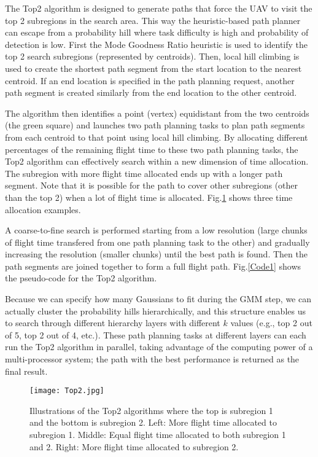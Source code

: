 The Top2 algorithm is designed to generate paths that force the UAV to visit the top 2 subregions in the search area. This way the heuristic-based path planner can escape from a probability hill where task difficulty is high and probability of detection is low. First the Mode Goodness Ratio heuristic is used to identify the top 2 search subregions (represented by centroids). Then, local hill climbing is used to create the shortest path segment from the start location to the nearest centroid. If an end location is specified in the path planning request, another path segment is created similarly from the end location to the other centroid. 

The algorithm then identifies a point (vertex) equidistant from the two centroids (the green square) and launches two path planning tasks to plan path segments from each centroid to that point using local hill climbing. By allocating different percentages of the remaining flight time to these two path planning tasks, the Top2 algorithm can effectively search within a new dimension of time allocation. The subregion with more flight time allocated ends up with a longer path segment. Note that it is possible for the path to cover other subregions (other than the top 2) when a lot of flight time is allocated. Fig.\ref{Top2} shows three time allocation examples. 

A coarse-to-fine search is performed starting from a low resolution (large chunks of flight time transfered from one path planning task to the other) and gradually increasing the resolution (smaller chunks) until the best path is found. Then the path segments are joined together to form a full flight path. Fig.\ref{Code1} shows the pseudo-code for the Top2 algorithm.

Because we can specify how many Gaussians to fit during the GMM step, we can actually cluster the probability hills hierarchically, and this structure enables us to search through different hierarchy layers with different $k$ values (e.g., top 2 out of 5, top 2 out of 4, etc.). These path planning tasks at different layers can each run the Top2 algorithm in parallel, taking advantage of the computing power of a multi-processor system; the path with the best performance is returned as the final result.
\begin{figure}
\centering
\texttt{[image: Top2.jpg]}
\caption{Illustrations of the Top2 algorithms where the top is subregion 1 and the bottom is subregion 2. Left: More flight time allocated to subregion 1. Middle: Equal flight time allocated to both subregion 1 and 2. Right: More flight time allocated to subregion 2.}
\label{Top2}
\end{figure}

